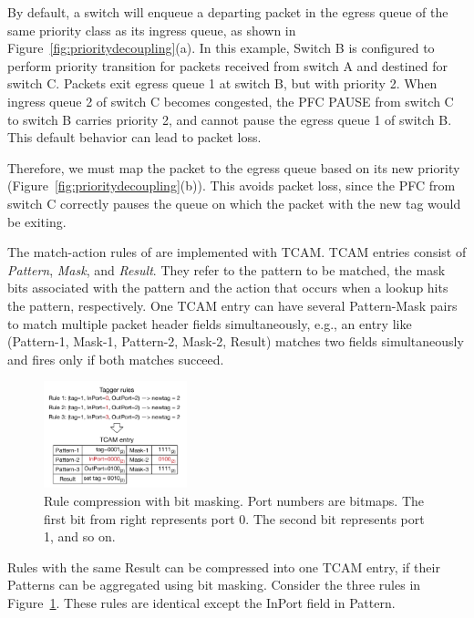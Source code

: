 By default, a switch will enqueue a departing packet in the egress queue
of the same priority class as its ingress queue, as shown in Figure~\ref{fig:prioritydecoupling}(a).
In this example, Switch B is configured to 
perform priority transition for packets received from switch A and destined for switch C.
Packets exit egress queue 1 at switch B, but with priority 2. 
When ingress queue 2 of switch C becomes congested, the PFC PAUSE from switch C 
to switch B carries priority 2, and cannot pause the egress queue 1 of switch B.
This default behavior can lead to packet loss.

Therefore, we must map the packet to the egress queue
based on its new priority (Figure~\ref{fig:prioritydecoupling}(b)).  
This avoids packet loss, since the PFC from switch C
correctly pauses the queue on which the packet with the new tag would be
exiting.

  The match-action rules of \sysname{}
are implemented with TCAM. TCAM entries consist of {\em Pattern},
{\em Mask}, and {\em Result}. They refer to the pattern to be matched, the mask bits 
associated with the pattern and the action that occurs when a lookup hits the pattern, 
respectively.  One TCAM entry can have several Pattern-Mask pairs to match multiple packet header fields
simultaneously, e.g., an entry like (Pattern-1, Mask-1, Pattern-2, Mask-2, Result)
matches two fields simultaneously and fires only if both matches succeed.

\begin{figure}
	 
	\centering
	\includegraphics[width=0.37\textwidth] {figs/compression_with_bitmasking}
	\vspace{-1em}
	\caption{Rule compression with bit masking. Port numbers are bitmaps.
	The first bit from right represents port 0. The second bit represents port 1, and so on. }\label{fig:compression}
    \vspace{-1.5em}	
\end{figure}

Rules with the same Result can be compressed into one TCAM entry, if their
Patterns can be aggregated using bit masking. Consider the three
rules in Figure~\ref{fig:compression}. These rules are identical except the InPort
field in Pattern.

